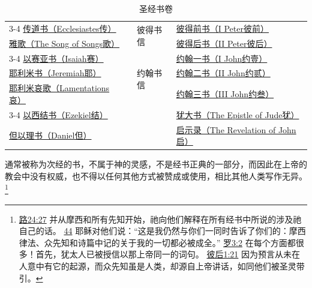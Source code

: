 \documentclass[12pt, a4paper, oneside]{ctexart}
\newcounter{parnum}[section]
\newcommand{\N}{%
   \noindent\refstepcounter{parnum}%
    \makebox[\parindent][l]{\textbf{\arabic{parnum}.}}}
\begin{document}
\begin{table}[ht]
\begin{tabular}{|l l  | l |l | }
			\cline{3-4}
			\href{https://biblehub.com/bibles/ecclesiastes}{传道书（Ecclesiastes传）}      &                &\multirow{2}{*}{彼得书信} & \href{https://biblehub.com/bibles/1_peter}{彼得前书（I Peter彼前）} \\
			\href{https://biblehub.com/bibles/songs}{雅歌（The Song of Songs歌）}   &                &        & \href{https://biblehub.com/bibles/2_peter}{彼得后书（II Peter彼后）} \\
			\cline{3-4}
			\href{https://biblehub.com/bibles/isaiah}{以赛亚书（Isaiah赛）}          &                &\multirow{3}{*}{约翰书信}& \href{https://biblehub.com/bibles/1_john}{约翰一书（I John约壹）} \\
			\href{https://biblehub.com/bibles/jeremiah}{耶利米书（Jeremiah耶）}        &                &        & \href{https://biblehub.com/bibles/2_john}{约翰二书（II John约贰）} \\
			\href{https://biblehub.com/bibles/lamentations}{耶利米哀歌（Lamentations哀）}  &                &        & \href{https://biblehub.com/bibles/3_john}{约翰三书（III John约叁）} \\
			\cline{3-4}
			\href{https://biblehub.com/bibles/ezekiel}{以西结书（Ezekiel结）}         &                &        & \href{https://biblehub.com/bibles/jude}{犹大书（The Epistle of Jude犹）} \\
			\href{https://biblehub.com/bibles/daniel}{但以理书（Daniel但）}          &                &        & \href{https://biblehub.com/bibles/revelation}{启示录（The Revelation of John启）} \\ 
			\hline
		\end{tabular}
		\caption{圣经书卷}
		\label{bible}
	\end{table}

\N 通常被称为次经的书，不属于神的灵感，不是经书正典的一部分，而因此在上帝的教会中没有权威，也不得以任何其他方式被赞成或使用，相比其他人类写作无异。
	\footnote {
		\href{https://biblehub.com/luke/24-27.htm}{路24:27} 并从摩西和所有先知开始，祂向他们解释在所有经书中所说的涉及祂自己的话。
		\href{https://biblehub.com/luke/24-44.htm}{44} 耶稣对他们说：“这是我仍然与你们一同时告诉了你们的：摩西律法、众先知和诗篇中记的关于我的一切都必被成全。” 
		\href{https://biblehub.com/romans/3-2.htm}{罗3:2} 在每个方面都很多！首先，犹太人已被授信以那上帝同一的词句。
		\href{https://biblehub.com/2_peter/1-21.htm}{彼后1:21} 因为预言从未在人意中有它的起源，而众先知虽是人类，却源自上帝讲话，如同他们被圣灵带引。
	}
\end{document}
